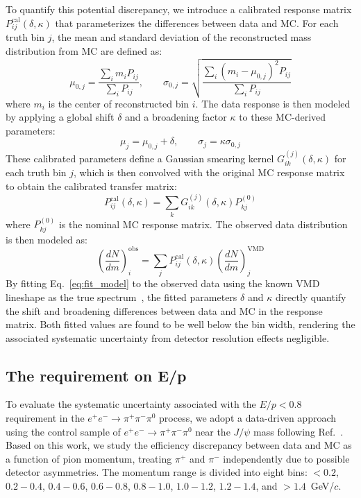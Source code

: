 To quantify this potential discrepancy, we introduce a calibrated response matrix \(P_{ij}^{\text{cal}}(\delta, \kappa)\) that parameterizes the differences between data and MC. For each truth bin \(j\), the mean and standard deviation of the reconstructed mass distribution from MC are defined as:
\begin{equation}
    \mu_{0,j} = \frac{\sum_i m_i P_{ij}}{\sum_i P_{ij}}, \qquad 
    \sigma_{0,j} = \sqrt{\frac{\sum_i (m_i - \mu_{0,j})^2 P_{ij}}{\sum_i P_{ij}}}
    \label{eq:mc_mean_sigma}
\end{equation}
where \(m_i\) is the center of reconstructed bin \(i\). The data response is then modeled by applying a global shift \(\delta\) and a broadening factor \(\kappa\) to these MC-derived parameters:
\begin{equation}
    \mu_j = \mu_{0,j} + \delta, \qquad \sigma_j = \kappa \sigma_{0,j}
    \label{eq:calibrated_params}
\end{equation}
These calibrated parameters define a Gaussian smearing kernel \(G_{ik}^{(j)}(\delta, \kappa)\) for each truth bin \(j\), which is then convolved with the original MC response matrix to obtain the calibrated transfer matrix:
\begin{equation}
    P_{ij}^{\text{cal}}(\delta, \kappa) = \sum_k G_{ik}^{(j)}(\delta, \kappa) P_{kj}^{(0)}
    \label{eq:calibrated_matrix}
\end{equation}
where \(P_{kj}^{(0)}\) is the nominal MC response matrix. The observed data distribution is then modeled as:
\begin{equation}
    \left( \frac{dN}{dm} \right)_{i}^{\text{obs}} = \sum_j P_{ij}^{\text{cal}}(\delta, \kappa) \left( \frac{dN}{dm} \right)_{j}^{\text{VMD}}
    \label{eq:fit_model}
\end{equation}
By fitting Eq.~\eqref{eq:fit_model} to the observed data using the known VMD lineshape as the true spectrum~\cite{Achasov2003,Czyz2006}, the fitted parameters \(\delta\) and \(\kappa\) directly quantify the shift and broadening differences between data and MC in the response matrix. Both fitted values are found to be well below the bin width, rendering the associated systematic uncertainty from detector resolution effects negligible.

\subsection{The requirement on E/p}

To evaluate the systematic uncertainty associated with the \(E/p < 0.8\) requirement in the \(e^+e^- \to \pi^+\pi^-\pi^0\) process, we adopt a data-driven approach using the control sample of \(e^+e^- \to \pi^+\pi^-\pi^0\) near the \(J/\psi\) mass following Ref.~\cite{BESIII_MEMO_1606}. Based on this work, we study the efficiency discrepancy between data and MC as a function of pion momentum, treating \(\pi^+\) and \(\pi^-\) independently due to possible detector asymmetries. The momentum range is divided into eight bins: \(<0.2\), \(0.2-0.4\), \(0.4-0.6\), \(0.6-0.8\), \(0.8-1.0\), \(1.0-1.2\), \(1.2-1.4\), and \(>1.4\)~GeV/\(c\).

